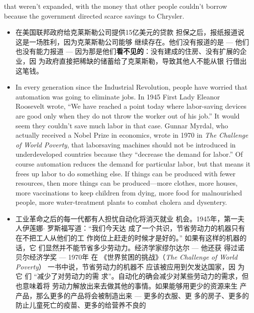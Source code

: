 \begin{paracol}{2}
\begin{itemize}
	that weren't expanded, with the money that other people
	couldn't borrow because the government directed scarce savings to Chrysler.
\end{itemize}
\switchcolumn
\begin{itemize}
	\item 在美国联邦政府给克莱斯勒公司提供15亿美元的贷款
	担保之后，报纸报道说这是一场胜利，因为克莱斯勒公司能够
	继续存在。他们没有报道的是 --- 他们也没有能力报道 --- 因为那是他们\textbf{看不见的}：没有建成的住房、没有扩展的企业，因
	为政府直接把稀缺的储蓄给了克莱斯勒，导致其他人不能从银
	行借出这笔钱。
\end{itemize}
\switchcolumn*
\begin{itemize}
	\item In every generation since the Industrial Revolution, people have worried that automation was going to eliminate jobs.
	In 1945 First Lady Eleanor Roosevelt wrote, ``We have
	reached a point today where labor-saving devices are good
	only when they do not throw the worker out of his job.'' It
	would seem they couldn't save much labor in that case. Gunnar Myrdal, who actually received a Nobel Prize in economics,
	wrote in 1970 in \textit{The Challenge of World Poverty}, that laborsaving machines should not be introduced in underdeveloped
	countries because they ``decrease the demand for labor.'' Of
	course automation reduces the demand for particular labor,
	but that means it frees up labor to do something else. If things
	can be produced with fewer resources, then more things can
	be produced---more clothes, more houses, more vaccinations
	to keep children from dying, more food for malnourished people, more water-treatment plants to combat cholera and
	dysentery.
\end{itemize}
\switchcolumn
\begin{itemize}
	\item 工业革命之后的每一代都有人担忧自动化将消灭就业
	机会。1945年，第一夫人伊莲娜$\cdot$ 罗斯福写道：“我们今天达
	成了一个共识，节省劳动力的机器只有在不把工人从他们的工
	作岗位上赶走的时候才是好的。” 如果有这样的机器的话，它
	们显然并不能节省多少劳动力。经济学家缪尔达尔 --- 他还获
	得过诺贝尔经济学奖 --- 1970年 在 《世界贫困的挑战》（\textit{The Challenge of World Poverty}） 一书中说，节省劳动力的机器不
	应该被应用到欠发达国家，因 为 它 们 “减少了对劳动力的需
	求”。自动化的确会减少对某些劳动力的需求，但也意味着将
	劳动力解放出来去做其他的事情。如果能够用更少的资源来生
	产产品，那么更多的产品将会被制造出来 --- 更多的衣服、更
	多的房子、更多的防止儿童死亡的疫苗、更多的给营养不良的

\end{itemize}
\end{paracol}
